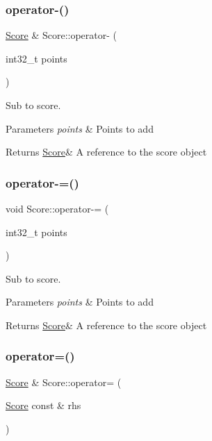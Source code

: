 \subsubsection{\texorpdfstring{operator-\/()}{operator-()}}
{\footnotesize\ttfamily \hyperlink{class_score}{Score} \& Score\+::operator-\/ (\begin{DoxyParamCaption}\item[{int32\+\_\+t}]{points }\end{DoxyParamCaption})}



Sub to score. 


\begin{DoxyParams}{Parameters}
{\em points} & Points to add \\
\hline
\end{DoxyParams}
\begin{DoxyReturn}{Returns}
\hyperlink{class_score}{Score}\& A reference to the score object 
\end{DoxyReturn}
\mbox{\label{class_score_a7e3638503831135f9faf77ed7feba03f}} 
\subsubsection{\texorpdfstring{operator-\/=()}{operator-=()}}
{\footnotesize\ttfamily void Score\+::operator-\/= (\begin{DoxyParamCaption}\item[{int32\+\_\+t}]{points }\end{DoxyParamCaption})}



Sub to score. 


\begin{DoxyParams}{Parameters}
{\em points} & Points to add \\
\hline
\end{DoxyParams}
\begin{DoxyReturn}{Returns}
\hyperlink{class_score}{Score}\& A reference to the score object 
\end{DoxyReturn}
\mbox{\label{class_score_a4cb0a45369bf4bdaea93c6f840643329}} 
\subsubsection{\texorpdfstring{operator=()}{operator=()}\hspace{0.1cm}{\footnotesize\ttfamily [1/2]}}
{\footnotesize\ttfamily \hyperlink{class_score}{Score} \& Score\+::operator= (\begin{DoxyParamCaption}\item[{\hyperlink{class_score}{Score} const \&}]{rhs }\end{DoxyParamCaption})}




